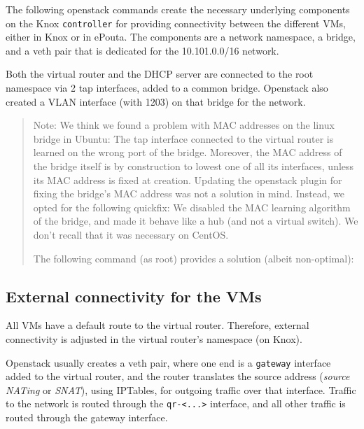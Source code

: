 The following openstack commands create the necessary underlying
components on the Knox \texttt{controller} for providing connectivity
between the different VMs, either in Knox or in ePouta. The components
are a network namespace, a bridge, and a veth pair that is dedicated
for the 10.101.0.0/16 network.


Both the virtual router and the DHCP server are connected to the root
namespace via 2 tap interfaces, added to a common bridge. Openstack
also created a VLAN interface (with 1203) on that bridge for the
 network.


\begin{quote}
  Note: We think we found a problem with MAC addresses on the linux
  bridge in Ubuntu: The tap interface connected to the virtual router
  is learned on the wrong port of the bridge. Moreover, the MAC
  address of the bridge itself is by construction to lowest one of all
  its interfaces, unless its MAC address is fixed at
  creation. Updating the openstack plugin for fixing the bridge's MAC
  address was not a solution in mind. Instead, we opted for the
  following quickfix: We disabled the MAC learning algorithm of the
  bridge, and made it behave like a hub (and not a virtual switch). We
  don't recall that it was necessary on CentOS.

  The following command (as root) provides a solution (albeit
  non-optimal):

\end{quote}

\subsection{External connectivity for the VMs}
\label{section:external:connectivity}

All VMs have a default route to the virtual router. Therefore,
external connectivity is adjusted in the virtual router's namespace
(on Knox).

Openstack usually creates a veth pair, where one end is a
\texttt{gateway} interface added to the virtual router, and the router
translates the source address (\emph{source NATing} or \emph{SNAT}),
using IPTables, for outgoing traffic over that interface. Traffic to
the  network is routed through the
\texttt{qr-\textless{}...\textgreater{}} interface, and all other
traffic is routed through the gateway interface.

